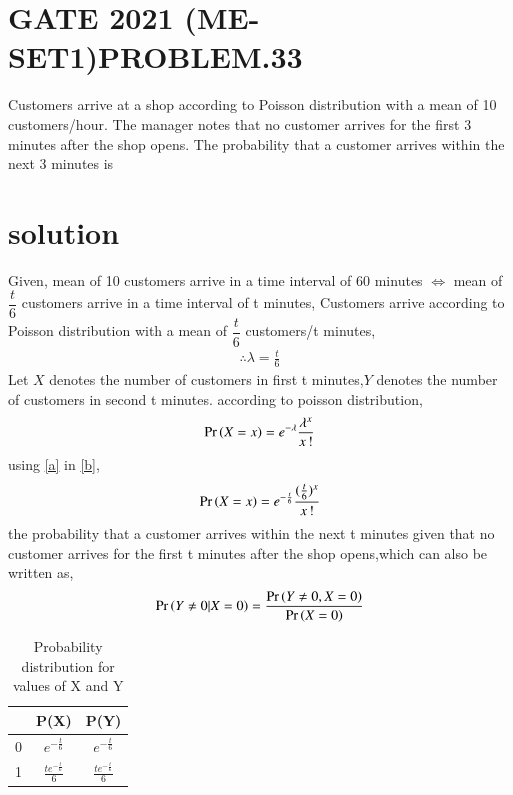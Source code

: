 \documentclass[journal,12pt,twocolumn]{IEEEtran}
\begin{document}
\section{GATE 2021 (ME-SET1)PROBLEM.33}
Customers arrive at a shop according to Poisson distribution with a mean of 10 customers/hour. The manager notes that no customer arrives for the first 3 minutes after the shop opens. The probability that a customer arrives within the next 3 minutes is
\section{solution}
Given, 
mean of 10 customers arrive in a time interval of 60 minutes $\iff$ mean of $\dfrac{t}{6}$ customers arrive in a time interval of t minutes,
Customers arrive according to Poisson distribution with a mean of $\dfrac{t}{6}$ customers/t minutes,
\begin{align}
\therefore \lambda = \frac{t}{6} \label{a}
\end{align}
Let $X$ denotes the number of customers in first t minutes,$Y$ denotes the number of customers in second t minutes.
according to  poisson distribution,
\begin{align}
\Pr\left(X=x\right)= e^{-\lambda} \frac{\lambda^{x}}{x\,!} \label{b}
\end{align}
using \eqref{a} in \eqref{b},
\begin{align}
\Pr\left(X=x\right)= e^{-\frac{t}{6}} \frac{(\frac{t}{6})^{x}}{x\,!} \label{c}
\end{align}
 the probability that a customer arrives within the next t minutes given that no customer arrives for the first t minutes after the shop opens,which can also be written as,
\begin{align}
\Pr\left(Y\neq 0|X=0\right)=\frac{\Pr\left(Y\neq 0,X=0\right)}{\Pr\left(X=0\right)}
\end{align}
\begin{table}[ht]
\caption{Probability distribution for values of X and Y}
\begin{center}
    \begin{tabular}{|c|c|c|}
    \hline
     & P(X)&P(Y)\\
    \hline
    0& $e^{-\frac{t}{6}}$& $e^{-\frac{t}{6}}$\\
    \hline
    1 & $\frac{t e^{-\frac{t}{6}}}{6}$ & $\frac{t e^{-\frac{t}{6}}}{6}$\\
    \hline
    \end{tabular}
\end{center} 
\end{table}
\end{document}
